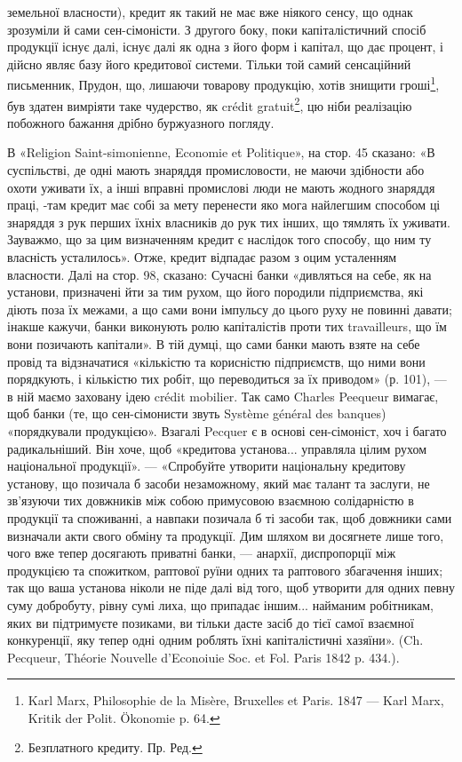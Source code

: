 \parcont{}  %
земельної власности), кредит як такий не має вже ніякого сенсу, що однак
зрозуміли й сами сен-сімоністи. З другого боку, поки капіталістичний спосіб
продукції існує далі, існує далі як одна з його форм і капітал, що дає процент,
і дійсно являє базу його кредитової системи. Тільки той самий сенсаційний письменник,
Прудон, що, лишаючи товарову продукцію, хотів знищити гроші\footnote{
Karl Marx, Philosophie de la Misère, Bruxelles et Paris. 1847 — Karl Marx, Kritik der Polit.
Ökonomie p. 64.
},
був здатен вимріяти таке чудерство, як crédit gratuit\footnote*{
Безплатного кредиту. Пр. Ред.
}, цю ніби реалізацію побожного
бажання дрібно буржуазного погляду.

В «Religion Saint-simonienne, Economie et Politique», на стор. 45 сказано:
«В суспільстві, де одні мають знаряддя промисловости, не маючи здібности або
охоти уживати їх, а інші вправні промислові люди не мають жодного знаряддя
праці, -там кредит має собі за мету перенести яко мога найлегшим способом
ці знаряддя з рук перших їхніх власників до рук тих інших, що тямлять їх
уживати. Зауважмо, що за цим визначенням кредит є наслідок того способу, що
ним ту власність усталилось». Отже, кредит відпадає разом з оцим усталенням
власности. Далі на стор. 98, сказано: Сучасні банки «дивляться на себе, як на
установи, призначені йти за тим рухом, що його породили підприємства, які діють
поза їх межами, а що сами вони імпульсу до цього руху не повинні давати; інакше
кажучи, банки виконують ролю капіталістів проти тих travailleurs, що їм вони позичають
капітали». В тій думці, що сами банки мають взяте на себе провід та відзначатися
«кількістю та корисністю підприємств, що ними вони порядкують, і кількістю
тих робіт, що переводиться за їх приводом» (р. 101), — в ній маємо заховану
ідею crédit mobilier. Так само Charles Peequeur вимагає, щоб банки (те, що сен-сімонисти
звуть Système général des banques) «порядкували продукцією». Взагалі Pecquer
є в основі сен-сімоніст, хоч і багато радикальніший. Він хоче, щоб «кредитова
установа... управляла цілим рухом національної продукції». — «Спробуйте
утворити національну кредитову установу, що позичала б засоби незаможному,
який має талант та заслуги, не зв’язуючи тих довжників між собою примусовою
взаємною солідарністю в продукції та споживанні, а навпаки позичала б
ті засоби так, щоб довжники сами визначали акти свого обміну та продукції.
Дим шляхом ви досягнете лише того, чого вже тепер досягають приватні банки, —
анархії, диспропорції між продукцією та спожитком, раптової руїни одних та
раптового збагачення інших; так що ваша установа ніколи не піде далі від того,
щоб утворити для одних певну суму добробуту, рівну сумі лиха, що припадає
іншим... найманим робітникам, яких ви підтримуєте позиками, ви тільки дасте
засіб до тієї самої взаємної конкуренції, яку тепер одні одним роблять їхні капіталістичні
хазяїни». (Ch. Pecqueur, Théorie Nouvelle d’Econoiuie Soc. et Fol. Paris
1842 p. 434.).

